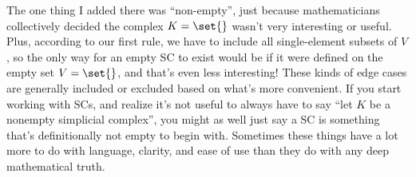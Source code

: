 \documentclass{lec}
\begin{document}
    The one thing I added there was ``non-empty'', just because mathematicians collectively decided the complex $K = \set{}$ wasn't very interesting or useful. Plus, according to our first rule, we have to include all single-element subsets of $V$, so the only way for an empty SC to exist would be if it were defined on the empty set $V = \set{}$, and that's even less interesting! These kinds of edge cases are generally included or excluded based on what's more convenient. If you start working with SCs, and realize it's not useful to always have to say ``let $K$ be a nonempty simplicial complex'', you might as well just say a SC is something that's definitionally not empty to begin with. Sometimes these things have a lot more to do with language, clarity, and ease of use than they do with any deep mathematical truth.
\end{document}
